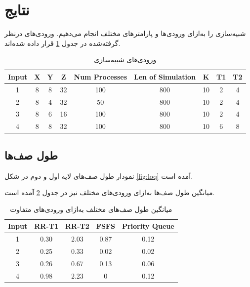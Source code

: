 \documentclass{article}
\begin{document}
\section{نتایج}
شبیه‌سازی را به‌ازای ورودی‌ها و پارامترهای مختلف انجام می‌دهیم.
ورودی‌های درنظر گرفته‌شده در جدول \ref{tab:inputs} قرار داده شده‌اند.
\begin{table}[h!]
	\centering
	\begin{latin}
		\begin{tabular}{ccccccccc}
			\toprule
			Input & X & Y & Z  & Num Processes & Len of Simulation & K  & T1 & T2 \\ \midrule
			1     & 8 & 8 & 32 & 100           & 800               & 10 & 2  & 4  \\
			2     & 8 & 4 & 32 & 50            & 800               & 10 & 2  & 4  \\
			3     & 8 & 6 & 16 & 100           & 800               & 10 & 2  & 4  \\
			4     & 8 & 8 & 32 & 100           & 800               & 10 & 6  & 8  \\ \bottomrule
		\end{tabular}
	\end{latin}
	\caption{ورودی‌های شبیه‌سازی}
	\label{tab:inputs}
\end{table}

\subsection{طول صف‌ها}
نمودار طول صف‌های لایه اول و دوم در شکل \ref{fig:loq} آمده است.

میانگین طول صف‌ها به‌ازای ورودی‌های مختلف نیز در جدول \ref{tab:loq} آمده است.

\begin{table}[h!]
	\centering
	\begin{latin}
		\begin{tabular}{ccccc}
			\toprule
			Input & RR-T1 & RR-T2 & FSFS & Priority Queue \\ \midrule
			1 & 0.30          & 2.03          & 0.87                   & 0.12           \\
			2 & 0.25          & 0.33          & 0.02                   & 0.02           \\
			3 & 0.26          & 0.67          & 0.13                   & 0.06           \\
			4 & 0.98          & 2.23          & 0                      & 0.12           \\ \bottomrule
		\end{tabular}
	\end{latin}
	\caption{میانگین طول صف‌های مختلف به‌ازای ورودی‌های متفاوت}
	\label{tab:loq}
\end{table}
\end{document}
